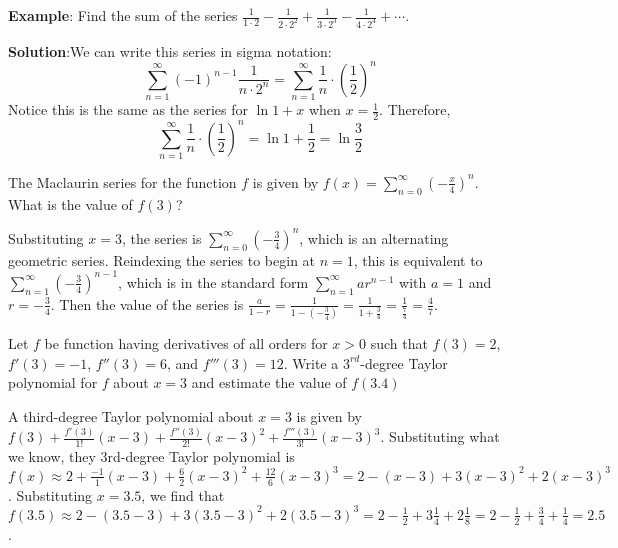 \textbf{Example}: Find the sum of the series $\frac{1}{1 \cdot 2} - \frac{1}{2 
\cdot 2^2} + \frac{1}{3 \cdot 2^3} - \frac{1}{4 \cdot 2^4} + \cdots$. 

\textbf{Solution}:We can write this series in sigma notation:
$$\sum_{n=1}^\infty (-1)^{n-1} \frac{1}{n \cdot 2^n} = \sum_{n = 1}^\infty 
\frac{1}{n} \cdot \left( \frac{1}{2} \right)^n$$
Notice this is the same as the series for $\ln{1 + x}$ when $x = \frac{1}{2}$. 
Therefore, 
$$\sum_{n = 1}^\infty \frac{1}{n} \cdot \left( \frac{1}{2} \right)^n = \ln{1 + 
\frac{1}{2}} = \ln{\frac{3}{2}}$$

\begin{Exercise} The Maclaurin series for the 
function $f$ is given by $f(x) = \sum_{n=0}^\infty \left( -\frac{x}{4} \right)^
n$. What is the value of $f(3)$?
\end{Exercise}

\begin{Answer}[ref = mac1]
Substituting $x = 3$, the series is $\sum_{n=0}^\infty \left( -\frac{3}{4} 
\right)^n$, which is an alternating geometric series. Reindexing the series to 
begin at $n = 1$, this is equivalent to $\sum_{n = 1}^\infty \left( - 
\frac{3}{4} \right) ^ {n - 1}$, which is in the standard form $\sum_{n=1}^
\infty ar^{n-1}$ with $a = 1$ and $r = -\frac{3}{4}$. Then the value of the 
series is $\frac{a}{1-r} = \frac{1}{1-\left(- \frac{3}{4} \right)} = \frac{1}{1 
+ \frac{3}{4}} = \frac{1}{\frac{7}{4}} = \frac{4}{7}$. 
\end{Answer}

\begin{Exercise} Let $f$ be function having 
derivatives of all orders for $x > 0$ such that $f(3) = 2$, $f'(3) = -1$, 
$f''(3) = 6$, and $f'''(3) = 12$. Write a $3^{rd}$-degree Taylor polynomial 
for $f$ about $x = 3$ and estimate the value of $f(3.4)$
\end{Exercise}

\begin{Answer}[ref = taylor1]
A third-degree Taylor polynomial about $x = 3$ is given by $f(3) + \frac{
f'(3)}{1!} (x - 3) + \frac{f''(3)}{2!} (x - 3) ^ 2 + \frac{f'''(3)}{3!} (x - 3) 
^ 3$. Substituting what we know, they 3rd-degree Taylor polynomial is $f(x) 
\approx 2 + \frac{-1}{1} (x - 3) + \frac{6}{2} (x - 3) ^ 2 + \frac{12}{6}(x - 
3) ^ 3 = 2 - (x - 3) + 3 (x - 3) ^ 2 + 2 (x - 3) ^ 3$. Substituting $x = 3.5$, 
we find that $f(3.5) \approx 2 - (3.5 - 3) + 3 ( 3.5 - 3) ^ 2 + 2 (3.5 - 3) ^ 3 
= 2 - \frac{1}{2} + 3 \frac{1}{4} + 2\frac{1}{8} = 2 - \frac{1}{2} + 
\frac{3}{4} + \frac{1}{4} = 2.5$.
\end{Answer}

